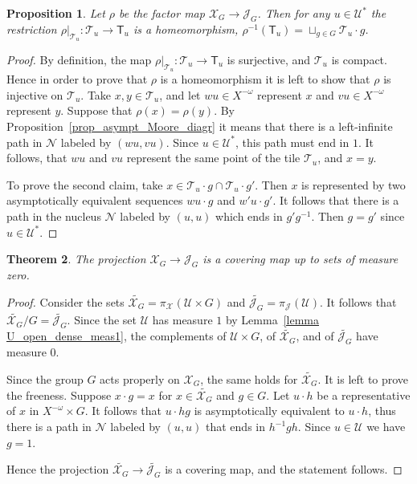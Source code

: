 \documentclass[12pt]{article}
\newcommand{\xmo}{X^{-\omega}}
\newcommand{\limGs}[1][G]{\mathcal{X}_{#1}}
\newcommand{\lims}[1][G]{\mathscr{J}_{#1}}
\newcommand{\tile}{\mathscr{T}}
\newcommand{\T}{\mathsf{T}}
\newcommand{\nucl}{\mathcal{N}}
\newtheorem{theor}{Theorem}
\newtheorem{prop}[theor]{Proposition}
\theoremstyle{definition}
\begin{document}
\begin{prop}\label{x_j_homeo}
Let $\rho$ be the factor map $\limGs\rightarrow\lims$. Then for any $u\in\mathcal{U}^*$ the
restriction $\rho|_{\tile_u}:\tile_u\rightarrow\T_u$ is a homeomorphism,
$\rho^{-1}(\T_u)=\sqcup_{g\in G}\tile_u\cdot g$.
\end{prop}
\begin{proof}
By definition, the map $\rho|_{\tile_u}:\tile_u\rightarrow\T_u$ is surjective, and $\tile_u$ is
compact. Hence in order to prove that $\rho$ is a homeomorphism it is left to show that $\rho$ is
injective on $\tile_u$. Take $x,y\in\tile_u$, and let $wu\in\xmo$ represent $x$ and $vu\in\xmo$
represent $y$. Suppose that $\rho(x)=\rho(y)$. By Proposition~\ref{prop_asympt_Moore_diagr} it
means that there is a left-infinite path in $\nucl$ labeled by $(wu,vu)$. Since
$u\in\mathcal{U}^*$, this path must end in $1$. It follows, that $wu$ and $vu$ represent the same
point of the tile $\tile_u$, and $x=y$.

To prove the second claim, take $x\in\tile_u\cdot g\cap\tile_u\cdot g'$. Then $x$ is represented by
two asymptotically equivalent sequences $wu\cdot g$ and $w'u\cdot g'$. It follows that there is a
path in the nucleus $\nucl$ labeled by $(u,u)$ which ends in $g'g^{-1}$. Then $g=g'$ since
$u\in\mathcal{U}^*$.
\end{proof}



\begin{theor}
The projection $\limGs\rightarrow\lims$ is a covering map up to sets of measure zero.
\end{theor}
\begin{proof}
Consider the sets $\tilde{\limGs}=\pi_{\limGs[]}(\mathcal{U}\times G)$ and
$\tilde{\lims}=\pi_{\lims[]}(\mathcal{U})$. It follows that $\tilde{\limGs}/G=\tilde{\lims}$. Since
the set $\mathcal{U}$ has measure $1$ by Lemma~\ref{lemma U_open_dense_meas1}, the complements of
$\mathcal{U}\times G$, of $\tilde{\limGs}$, and of $\tilde{\lims}$ have measure $0$.


Since the group $G$ acts properly on $\limGs$, the same holds for $\tilde{\limGs}$. It is left to
prove the freeness. Suppose $x\cdot g=x$ for $x\in\tilde{\limGs}$ and $g\in G$. Let $u\cdot h$ be a
representative of $x$ in $\xmo\times G$. It follows that $u\cdot hg$ is asymptotically equivalent
to $u\cdot h$, thus there is a path in $\nucl$ labeled by $(u,u)$ that ends in $h^{-1}gh$. Since
$u\in\mathcal{U}$ we have $g=1$.

Hence the projection $\tilde{\limGs}\rightarrow\tilde{\lims}$ is a covering map, and the statement
follows.
\end{proof}
\end{document}
